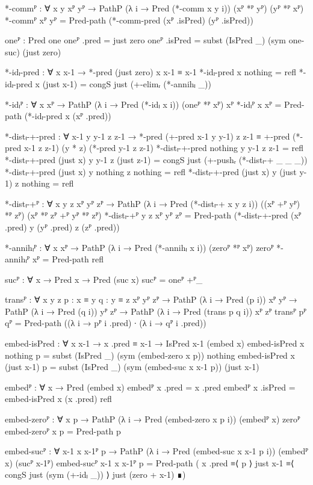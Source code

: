 \begin{code}[hide]
  *-commᴾ :
    ∀ {x y} xᴾ yᴾ → PathP (λ i → Pred (*-comm x y i)) (xᴾ *ᴾ yᴾ) (yᴾ *ᴾ xᴾ)
  *-commᴾ xᴾ yᴾ = Pred-path (*-comm-pred (xᴾ .isPred) (yᴾ .isPred))

  oneᴾ : Pred one
  oneᴾ .pred = just zero
  oneᴾ .isPred = subst (IsPred _) (sym one-suc) (just zero)

  *-idₗ-pred : ∀ x x-1 → *-pred (just zero) x x-1 ≡ x-1
  *-idₗ-pred x nothing = refl
  *-idₗ-pred x (just x-1) = congS just (+-elimᵣ (*-annihₗ _))

  *-idₗᴾ : ∀ {x} xᴾ → PathP (λ i → Pred (*-idₗ x i)) (oneᴾ *ᴾ xᴾ) xᴾ
  *-idₗᴾ {x} xᴾ = Pred-path (*-idₗ-pred x (xᴾ .pred))

  *-distₗ-+-pred :
    ∀ x-1 y y-1 z z-1 →
    *-pred (+-pred x-1 y y-1) z z-1 ≡
    +-pred (*-pred x-1 z z-1) (y * z) (*-pred y-1 z z-1)
  *-distₗ-+-pred nothing y y-1 z z-1 = refl
  *-distₗ-+-pred (just x) y y-1 z (just z-1) =
    congS just (+-pushᵣ (*-distₗ-+ _ _ _))
  *-distₗ-+-pred (just x) y nothing z nothing = refl
  *-distₗ-+-pred (just x) y (just y-1) z nothing = refl

  *-distₗ-+ᴾ :
    ∀ {x y z} xᴾ yᴾ zᴾ →
    PathP (λ i → Pred (*-distₗ-+ x y z i))
      ((xᴾ +ᴾ yᴾ) *ᴾ zᴾ) (xᴾ *ᴾ zᴾ +ᴾ yᴾ *ᴾ zᴾ)
  *-distₗ-+ᴾ {y} {z} xᴾ yᴾ zᴾ =
    Pred-path (*-distₗ-+-pred (xᴾ .pred) y (yᴾ .pred) z (zᴾ .pred))

  *-annihₗᴾ : ∀ {x} xᴾ → PathP (λ i → Pred (*-annihₗ x i)) (zeroᴾ *ᴾ xᴾ) zeroᴾ
  *-annihₗᴾ xᴾ = Pred-path refl

  sucᴾ : ∀ {x} → Pred x → Pred (suc x)
  sucᴾ = oneᴾ +ᴾ_

  transᴾ :
    ∀ {x y z} {p : x ≡ y} {q : y ≡ z} {xᴾ yᴾ zᴾ} →
    PathP (λ i → Pred (p i)) xᴾ yᴾ → PathP (λ i → Pred (q i)) yᴾ zᴾ →
    PathP (λ i → Pred (trans p q i)) xᴾ zᴾ
  transᴾ pᴾ qᴾ = Pred-path ((λ i → pᴾ i .pred) ∙ (λ i → qᴾ i .pred))

  embed-isPred : ∀ x x-1 → x .pred ≡ x-1 → IsPred x-1 (embed x)
  embed-isPred x nothing p = subst (IsPred _) (sym (embed-zero x p)) nothing
  embed-isPred x (just x-1) p =
    subst (IsPred _) (sym (embed-suc x x-1 p)) (just x-1)

  embedᴾ : ∀ x → Pred (embed x)
  embedᴾ x .pred = x .pred
  embedᴾ x .isPred = embed-isPred x (x .pred) refl

  embed-zeroᴾ : ∀ x p → PathP (λ i → Pred (embed-zero x p i)) (embedᴾ x) zeroᴾ
  embed-zeroᴾ x p = Pred-path p

  embed-sucᴾ :
    ∀ {x-1} x x-1ᴾ p →
    PathP (λ i → Pred (embed-suc x x-1 p i)) (embedᴾ x) (sucᴾ x-1ᴾ)
  embed-sucᴾ {x-1} x x-1ᴾ p = Pred-path
    ( x .pred           ≡⟨ p ⟩
      just x-1          ≡⟨ congS just (sym (+-idₗ _)) ⟩
      just (zero + x-1) ∎)
\end{code}
